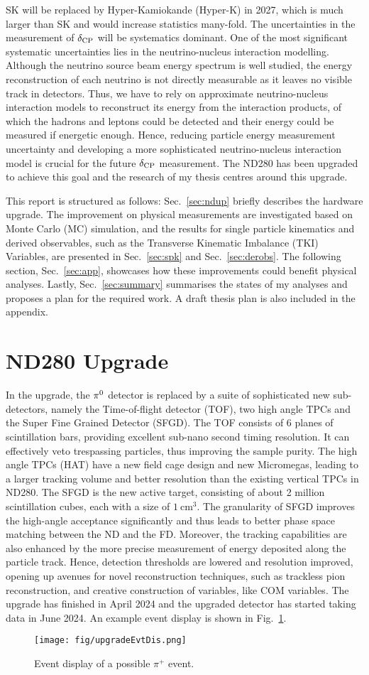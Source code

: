    SK will be replaced by Hyper-Kamiokande (Hyper-K) in 2027, which is much larger than SK and would increase statistics many-fold. 
   The uncertainties in the measurement of $\delta_\textrm{CP}$ will be systematics dominant. One of the most significant systematic uncertainties lies in the neutrino-nucleus interaction modelling. Although the neutrino source beam energy spectrum is well studied, the energy reconstruction of each neutrino is not directly measurable as it leaves no visible track in detectors. Thus, we have to rely on approximate neutrino-nucleus interaction models to reconstruct its energy from the interaction products, of which the hadrons and leptons could be detected and their energy could be measured if energetic enough. Hence, reducing particle energy measurement uncertainty and developing a more sophisticated neutrino-nucleus interaction model is crucial for the future $\delta_\textrm{CP}$ measurement. The ND280 has been upgraded to achieve this goal and the research of my thesis centres around this upgrade. 

   This report is structured as follows: Sec.~\ref{sec:ndup} briefly describes the hardware upgrade. 
   The improvement on physical measurements are investigated based on Monte Carlo (MC) simulation, and the results for single particle kinematics and derived observables, such as the Transverse Kinematic Imbalance (TKI) Variables, are presented in Sec.~\ref{sec:spk} and Sec.~\ref{sec:derobs}. 
   The following section, Sec.~\ref{sec:app}, showcases how these improvements could benefit physical analyses. Lastly, Sec.~\ref{sec:summary} summarises the states of my analyses and proposes a plan for the required work. A draft thesis plan is also included in the appendix.
\section{\label{sec:ndup} ND280 Upgrade}
   In the upgrade, the $\pi^0$ detector is replaced by a suite of sophisticated new sub-detectors, namely the Time-of-flight detector (TOF), two high angle TPCs and the Super Fine Grained Detector (SFGD). 
   The TOF consists of 6 planes of scintillation bars, providing excellent sub-nano second timing resolution. 
   It can effectively veto trespassing particles, thus improving the sample purity.
   The high angle TPCs (HAT) have a new field cage design and new Micromegas, leading to a larger tracking volume and better resolution than the existing vertical TPCs in ND280. 
   The SFGD is the new active target, consisting of about 2 million scintillation cubes, each with a size of $1~\textrm{cm}^3$. 
   The granularity of SFGD improves the high-angle acceptance significantly and thus leads to better phase space matching between the ND and the FD. 
   Moreover, the tracking capabilities are also enhanced by the more precise measurement of energy deposited along the particle track. 
   Hence, detection thresholds are lowered and resolution improved, opening up avenues for novel reconstruction techniques, such as trackless pion reconstruction, and creative construction of variables, like COM variables. 
   The upgrade has finished in April 2024 and the upgraded detector has started taking data in June 2024. An example event display is shown in Fig.~\ref{fig:ndup-evedis}. 

    \begin{figure}[!htb]
        \centering
        \texttt{[image: fig/upgradeEvtDis.png]}
        \caption{Event display of a possible $\pi^+$ event.}
        \label{fig:ndup-evedis}
    \end{figure}